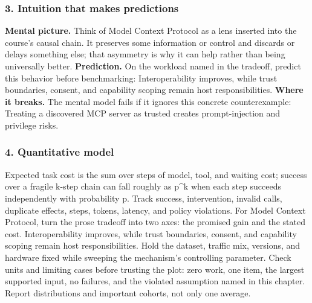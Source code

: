 \subsubsection*{3. Intuition that makes predictions}
\textbf{Mental picture.} Think of Model Context Protocol as a lens inserted into the course's causal chain. It preserves some information or control and discards or delays something else; that asymmetry is why it can help rather than being universally better.
\textbf{Prediction.} On the workload named in the tradeoff, predict this behavior before benchmarking: Interoperability improves, while trust boundaries, consent, and capability scoping remain host responsibilities.
\textbf{Where it breaks.} The mental model fails if it ignores this concrete counterexample: Treating a discovered MCP server as trusted creates prompt-injection and privilege risks.
\subsubsection*{4. Quantitative model}
Expected task cost is the sum over steps of model, tool, and waiting cost; success over a fragile k-step chain can fall roughly as p\textasciicircum{}k when each step succeeds independently with probability p. Track success, intervention, invalid calls, duplicate effects, steps, tokens, latency, and policy violations.
For Model Context Protocol, turn the prose tradeoff into two axes: the promised gain and the stated cost. Interoperability improves, while trust boundaries, consent, and capability scoping remain host responsibilities. Hold the dataset, traffic mix, versions, and hardware fixed while sweeping the mechanism's controlling parameter.
Check units and limiting cases before trusting the plot: zero work, one item, the largest supported input, no failures, and the violated assumption named in this chapter. Report distributions and important cohorts, not only one average.
